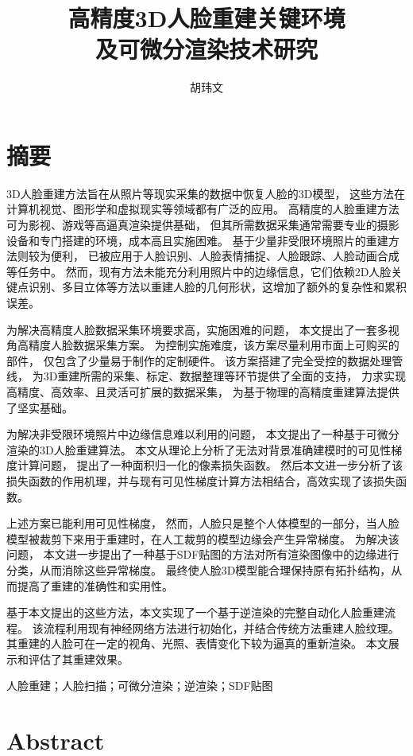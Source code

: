 \documentclass{scutmaster}
\title{高精度3D人脸重建关键环境\texorpdfstring{\hspace*{\fill}\\\hspace*{\fill}}{}及可微分渲染技术研究}
\date{\zhtoday}
\author{胡玮文}
\begin{document}
\maketitle
\hideinblind{
    \maketitleEN
    \nominationpage
    \declareoforiginality
}

\frontmatter
\chapter{摘\texorpdfstring{\quad}{}要}

3D人脸重建方法旨在从照片等现实采集的数据中恢复人脸的3D模型，
这些方法在计算机视觉、图形学和虚拟现实等领域都有广泛的应用。
高精度的人脸重建方法可为影视、游戏等高逼真渲染提供基础，
但其所需数据采集通常需要专业的摄影设备和专门搭建的环境，成本高且实施困难。
基于少量非受限环境照片的重建方法则较为便利，
已被应用于人脸识别、人脸表情捕捉、人脸跟踪、人脸动画合成等任务中。
然而，现有方法未能充分利用照片中的边缘信息，它们依赖2D人脸关键点识别、多目立体等方法以重建人脸的几何形状，这增加了额外的复杂性和累积误差。

为解决高精度人脸数据采集环境要求高，实施困难的问题，
本文提出了一套多视角高精度人脸数据采集方案。
为控制实施难度，该方案尽量利用市面上可购买的部件，
仅包含了少量易于制作的定制硬件。
该方案搭建了完全受控的数据处理管线，
为3D重建所需的采集、标定、数据整理等环节提供了全面的支持，
力求实现高精度、高效率、且灵活可扩展的数据采集，
为基于物理的高精度重建算法提供了坚实基础。

为解决非受限环境照片中边缘信息难以利用的问题，
本文提出了一种基于可微分渲染的3D人脸重建算法。
本文从理论上分析了无法对背景准确建模时的可见性梯度计算问题，
提出了一种面积归一化的像素损失函数。
然后本文进一步分析了该损失函数的作用机理，并与现有可见性梯度计算方法相结合，高效实现了该损失函数。

上述方案已能利用可见性梯度，
然而，人脸只是整个人体模型的一部分，当人脸模型被裁剪下来用于重建时，在人工裁剪的模型边缘会产生异常梯度。
为解决该问题，
本文进一步提出了一种基于SDF贴图的方法对所有渲染图像中的边缘进行分类，从而消除这些异常梯度。
最终使人脸3D模型能合理保持原有拓扑结构，从而提高了重建的准确性和实用性。

基于本文提出的这些方法，本文实现了一个基于逆渲染的完整自动化人脸重建流程。
该流程利用现有神经网络方法进行初始化，并结合传统方法重建人脸纹理。
其重建的人脸可在一定的视角、光照、表情变化下较为逼真的重新渲染。
本文展示和评估了其重建效果。

 人脸重建；人脸扫描；可微分渲染；逆渲染；SDF贴图

\chapter{Abstract}
\end{document}

